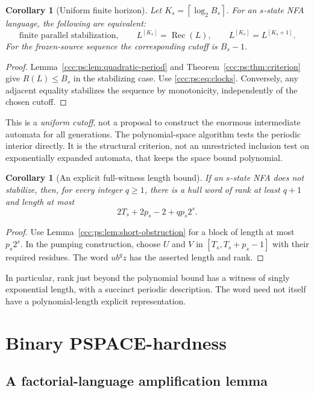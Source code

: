 \documentclass[11pt,letterpaper]{article}
\newtheorem{corollary}[theorem]{Corollary}
\theoremstyle{definition}
\theoremstyle{remark}
\newcommand{\rec}{\operatorname{Rec}}
\newcommand{\gen}[2]{#1^{[#2]}}
\newcommand{\clog}[1]{\left\lceil\log_2 #1\right\rceil}
\begin{document}
\begin{corollary}[Uniform finite horizon]\label{ccc:ps:cor:cutoff}
Let $K_s=\clog{B_s}$. For an $s$-state NFA language, the following are
equivalent:
\[
 \text{finite parallel stabilization},\qquad
 \gen L{K_s}=\rec(L),\qquad
 \gen L{K_s}=\gen L{K_s+1}.
\]
For the frozen-source sequence the corresponding cutoff is $B_s-1$.
\end{corollary}
\begin{proof}
Lemma~\ref{ccc:ps:lem:quadratic-period} and
Theorem~\ref{ccc:ps:thm:criterion} give $R(L)\le B_s$ in the stabilizing case.
Use \eqref{ccc:ps:eq:clocks}. Conversely, any adjacent equality stabilizes the
sequence by monotonicity, independently of the chosen cutoff.
\end{proof}

This is a \emph{uniform cutoff}, not a proposal to construct the enormous
intermediate automata for all generations. The polynomial-space algorithm
tests the periodic interior directly. It is the structural criterion, not
an unrestricted inclusion test on exponentially expanded automata, that
keeps the space bound polynomial.

\begin{corollary}[An explicit full-witness length bound]\label{ccc:ps:cor:witness-length}
If an $s$-state NFA does not stabilize, then, for every integer $q\ge1$,
there is a hull word of rank at least $q+1$ and length at most
\[
 2T_s+2p_s-2+q p_s2^s.
\]
\end{corollary}
\begin{proof}
Use Lemma~\ref{ccc:ps:lem:short-obstruction} for a block of length at most
$p_s2^s$. In the pumping construction, choose $U$ and $V$ in
$[T_s,T_s+p_s-1]$ with their required residues. The word $ub^qz$
has the asserted length and rank.
\end{proof}

In particular, rank just beyond the polynomial bound has a witness of
singly exponential length, with a succinct periodic description. The word
need not itself have a polynomial-length explicit representation.

\section{Binary PSPACE-hardness}\label{ccc:ps:sec:hardness}

\subsection{A factorial-language amplification lemma}
\end{document}

